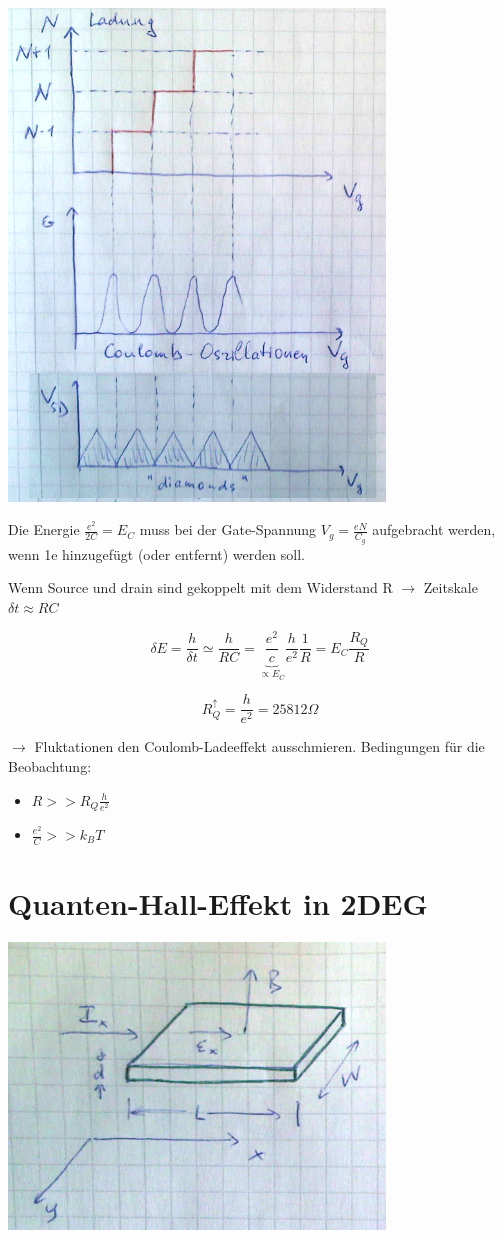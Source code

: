 \includegraphics[width=0.75\textwidth]{kap11_08.png}

Die Energie \(\frac{e^2}{2C}=E_C\) muss bei der Gate-Spannung \(V_g = \frac{eN}{C_g}\) aufgebracht werden, wenn 1e hinzugefügt (oder entfernt) werden soll.

Wenn Source und drain sind gekoppelt mit dem Widerstand R \(\rightarrow \) Zeitskale \(\delta t \approx RC\)

\[\delta E = \frac{h}{\delta t} \simeq \frac{h}{RC} = \underbrace{\frac{e^2}{c}}_{\propto E_C}\frac{h}{e^2}\frac{1}{R} = E_C\frac{R_Q}{R}\]

\[R^\uparrow_Q = \frac{h}{e^2}=25812\Omega\]

\(\rightarrow \) Fluktationen den Coulomb-Ladeeffekt ausschmieren. Bedingungen für die Beobachtung:

\begin{itemize}
\item \(R>>R_Q\frac{h}{e^2}\)
\item \(\frac{e^2}{C}>>k_BT\)
\end{itemize}


\section{Quanten-Hall-Effekt in 2DEG}

\includegraphics[width=0.75\textwidth]{kap11_09.png}

